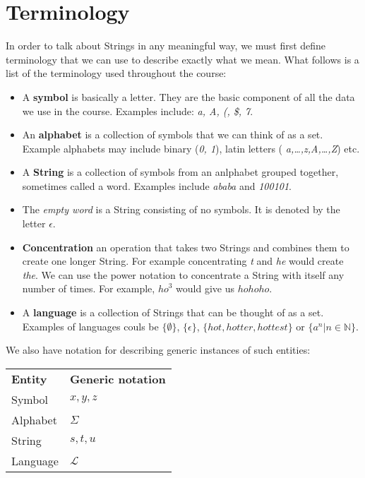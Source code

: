 
\section{Terminology}

In order to talk about Strings in any meaningful way, we must first define
terminology that we can use to describe exactly what we mean. What follows is a
list of the terminology used throughout the course:

\begin{itemize}
	\item A {\bf symbol} is basically a letter. They are the basic component of
	all the data we use in the course. Examples include: {\it a, A, (, \$, 7}.
	\item An {\bf alphabet} is a collection of symbols that we can think of as a
	set. Example alphabets may include binary ({\it 0, 1}), latin letters ({\it
	a,\dots,z,A,\dots,Z}) etc.
	\item A {\bf String} is a collection of symbols from an anlphabet grouped
	together, sometimes	called a word. Examples include {\it ababa} and
	{\it 100101}.
	\item The {\it empty word} is a String consisting of no symbols. It is
	denoted by the letter $\epsilon$.
	\item {\bf Concentration} an operation that takes two Strings and combines
	them to create one longer String. For example concentrating {\it t} and {\it
	he} would create {\it the}. We can use the power notation to concentrate a
	String with itself any number of times. For example, ${ho}^3$ would give us
	$hohoho$.
	\item A {\bf language} is a collection of Strings that can be thought of as
	a set. Examples of languages couls be $\{\emptyset\}$, $\{\epsilon\}$,
	$\{hot,hotter,hottest\}$ or $\{a^n | n \in \mathbb{N}\}$.
\end{itemize}

We also have notation for describing generic instances of such entities:

\begin{center}
	\begin{tabular}{l l}
		{\bf Entity} & {\bf Generic notation}\\
		Symbol & $x, y, z$\\
		Alphabet & $\Sigma$\\
		String & $s, t, u$\\
		Language & $\mathcal{L}$\\
	\end{tabular}
\end{center}

